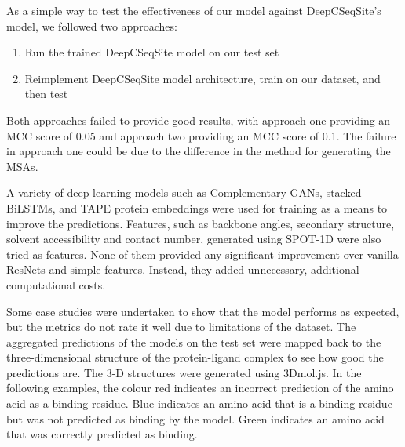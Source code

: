 \documentclass[journal=jcisd8,manuscript=article]{achemso}
\begin{document}
As a simple way to test the effectiveness of our model against DeepCSeqSite's model, we followed two approaches:
\begin{enumerate}
    \item Run the trained DeepCSeqSite model on our test set
    \item Reimplement DeepCSeqSite model architecture, train on our dataset, and then test
\end{enumerate}

Both approaches failed to provide good results, with approach one providing an MCC score of 0.05 and approach two providing an MCC score of 0.1. The failure in approach one could be due to the difference in the method for generating the MSAs.

A variety of deep learning models such as Complementary GANs, stacked BiLSTMs, and TAPE protein embeddings were used for training as a means to improve the predictions. Features, such as backbone angles, secondary structure, solvent accessibility and contact number, generated using SPOT-1D \cite{hanson2018accurate} were also tried as features. None of them provided any significant improvement over vanilla ResNets and simple features. Instead, they added unnecessary, additional computational costs.








\quad Some case studies were undertaken to show that the model performs as expected, but the metrics do not rate it well due to limitations of the dataset. The aggregated predictions of the models on the test set were mapped back to the three-dimensional structure of the protein-ligand complex to see how good the predictions are. The 3-D structures were generated using 3Dmol.js\cite{rego20153dmol}. In the following examples, the colour red indicates an incorrect prediction of the amino acid as a binding residue. Blue indicates an amino acid that is a binding residue but was not predicted as binding by the model. Green indicates an amino acid that was correctly predicted as binding.
\end{document}
